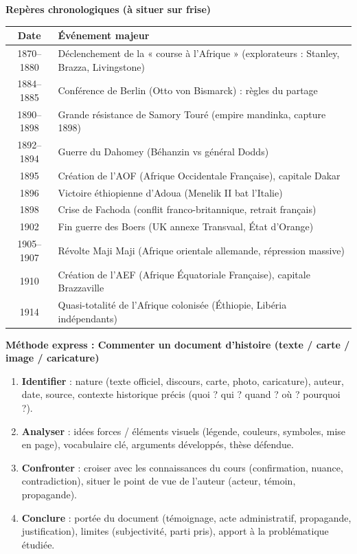 \documentclass[11pt]{article}
\begin{document}
\begin{aretenir}
\textbf{Repères chronologiques (à situer sur frise)}
\begin{center}
\begin{tabularx}{\linewidth}{|c|X|}\hline
\textbf{Date} & \textbf{Événement majeur} \\\hline
1870--1880 & Déclenchement de la « course à l'Afrique » (explorateurs : Stanley, Brazza, Livingstone) \\\hline
1884--1885 & Conférence de Berlin (Otto von Bismarck) : règles du partage \\\hline
1890--1898 & Grande résistance de Samory Touré (empire mandinka, capture 1898) \\\hline
1892--1894 & Guerre du Dahomey (Béhanzin vs général Dodds) \\\hline
1895 & Création de l'AOF (Afrique Occidentale Française), capitale Dakar \\\hline
1896 & Victoire éthiopienne d'Adoua (Menelik II bat l'Italie) \\\hline
1898 & Crise de Fachoda (conflit franco-britannique, retrait français) \\\hline
1902 & Fin guerre des Boers (UK annexe Transvaal, État d'Orange) \\\hline
1905--1907 & Révolte Maji Maji (Afrique orientale allemande, répression massive) \\\hline
1910 & Création de l'AEF (Afrique Équatoriale Française), capitale Brazzaville \\\hline
1914 & Quasi-totalité de l'Afrique colonisée (Éthiopie, Libéria indépendants) \\\hline
\end{tabularx}
\end{center}

\textbf{Méthode express : Commenter un document d'histoire (texte / carte / image / caricature)}
\begin{enumerate}
  \item \textbf{Identifier} : nature (texte officiel, discours, carte, photo, caricature), auteur, date, source, contexte historique précis (quoi ? qui ? quand ? où ? pourquoi ?).
  \item \textbf{Analyser} : idées forces / éléments visuels (légende, couleurs, symboles, mise en page), vocabulaire clé, arguments développés, thèse défendue.
  \item \textbf{Confronter} : croiser avec les connaissances du cours (confirmation, nuance, contradiction), situer le point de vue de l'auteur (acteur, témoin, propagande).
  \item \textbf{Conclure} : portée du document (témoignage, acte administratif, propagande, justification), limites (subjectivité, parti pris), apport à la problématique étudiée.
\end{enumerate}


\end{aretenir}
\end{document}
